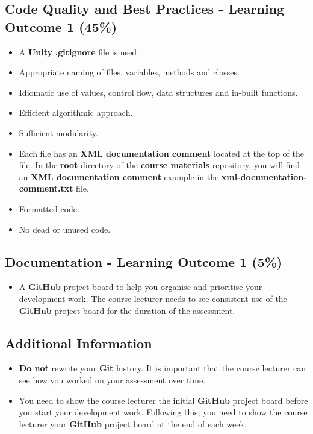\documentclass{article}
\begin{document}
\subsection*{Code Quality and Best Practices - Learning Outcome 1 (45\%)}
\begin{itemize}
    \item A \textbf{Unity} \textbf{.gitignore} file is used. 
    \item Appropriate naming of files, variables, methods and classes.
    \item Idiomatic use of values, control flow, data structures and in-built functions.
    \item Efficient algorithmic approach.
    \item Sufficient modularity.
    \item Each file has an \textbf{XML documentation comment} located at the top of the file. In the \textbf{root} directory of the \textbf{course materials} repository, you will find an \textbf{XML documentation comment} example in the \textbf{xml-documentation-comment.txt} file.
    \item Formatted code.
    \item No dead or unused code.
\end{itemize} 

\subsection*{Documentation - Learning Outcome 1 (5\%)}
\begin{itemize}
	\item A \textbf{GitHub} project board to help you organise and prioritise your development work. The course lecturer needs to see consistent use of the \textbf{GitHub} project board for the duration of the assessment.
\end{itemize} 

\subsection*{Additional Information}
\begin{itemize}
    \item \textbf{Do not} rewrite your \textbf{Git} history. It is important that the course lecturer can see how you worked on your assessment over time. 
    \item You need to show the course lecturer the initial \textbf{GitHub} project board before you start your development work. Following this, you need to show the course lecturer your \textbf{GitHub} project board at the end of each week.
\end{itemize} 
\end{document}

